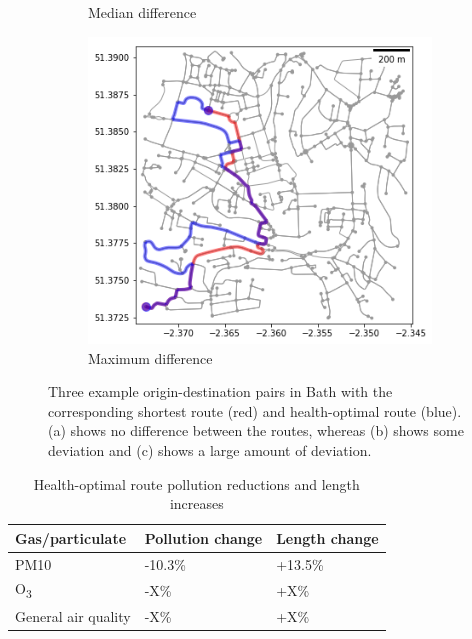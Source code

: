 \documentclass[11pt]{report}
\begin{document}
\begin{figure}[!tb]
\begin{minipage}{1\linewidth}
\begin{subfigure}[t]{.5\linewidth}
            	\caption{Median difference}
            	\label{fig:route_median}
	   \end{subfigure}
        \end{minipage}
    \begin{minipage}{1\linewidth}
    	\centering
        \begin{subfigure}[t]{.5\linewidth}
            \includegraphics[width=\textwidth]{images/health_optimal_route_max}
            \caption{Maximum difference}
            \label{fig:route_max}
        \end{subfigure}
    \end{minipage}
    \caption[Example routes.]{Three example origin-destination pairs in Bath with the corresponding shortest route (red) and health-optimal route (blue). (a) shows no difference between the routes, whereas (b) shows some deviation and (c) shows a large amount of deviation.}
    \label{fig:origdestpairs}
\end{figure}

\begin{table}[!tbp]
  \centering
  \caption{Health-optimal route pollution reductions and length increases}
  \label{tab:pollution_reductions}
  \begin{tabular}{ l l l }
  \toprule
  Gas/particulate & Pollution change & Length change \\ \midrule
  PM10 & -10.3\% & +13.5\% \\
  O\textsubscript{3} & -X\% & +X\% \\
  General air quality & -X\% & +X\% \\ \bottomrule
  \end{tabular}
\end{table}
\end{document}
